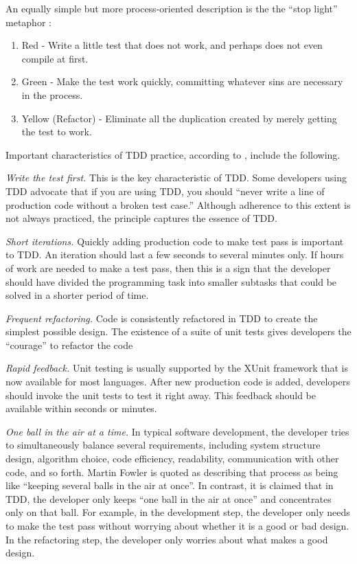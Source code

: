 \documentclass[smallextended]{svjour3}     %
\begin{document}
An equally simple but more process-oriented description is the the 
``stop light'' metaphor \citep{Beck:03}: 
\begin{enumerate}
\item Red - Write a little test that does not work, and perhaps does not even compile at first.
\item Green - Make the test work quickly, committing whatever sins are necessary in the process.
\item Yellow (Refactor) - Eliminate all the duplication created by merely getting the test to work.
\end{enumerate}

Important characteristics of TDD practice, according to \cite{Beck:01,Beck:03},  include the following.

{\em Write the test first.}
This is the key characteristic of TDD. Some developers using TDD advocate that if
 you are using 
TDD, you should ``never write a line of production 
code without a broken test case.'' 
Although adherence to this extent is not always practiced, the principle  
captures the essence of TDD. 

{\em Short iterations.}
Quickly adding production code to make test pass is important
to TDD. An iteration should last a few seconds to 
several minutes only. If hours of work are needed to make a 
test pass, then this is a sign that the developer should have divided the programming 
task into smaller subtasks that could be solved in a shorter
period of time.

{\em Frequent refactoring.}
Code is consistently refactored in TDD to create the simplest
possible design. The existence of a suite of unit tests gives 
developers the ``courage'' to refactor the code

{\em Rapid feedback.}
Unit testing is usually supported by the XUnit
framework that is now available for most languages.
After new production code is added, developers should invoke
the unit tests to test it right away. This feedback should be available
within seconds or minutes. 

{\em One ball in the air at a time.}  In typical software development, the
developer tries to simultaneously balance several requirements, including
system structure design, algorithm choice, code efficiency, readability,
communication with other code, and so forth.  Martin Fowler is quoted as
describing that process as being like ``keeping several balls in the air at
once''.  In contrast, it is claimed that in TDD, the developer only keeps
``one ball in the air at once'' and concentrates only on that ball. For
example, in the development step, the developer only needs to make the test
pass without worrying about whether it is a good or bad design. In the
refactoring step, the developer only worries about what makes a good
design.
\end{document}
